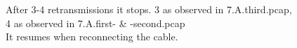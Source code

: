 After 3-4 retransmissions it stops.
3 as observed in 7.A.third.pcap, \\
4 as observed in 7.A.first- \& -second.pcap\\
It resumes when reconnecting the cable.